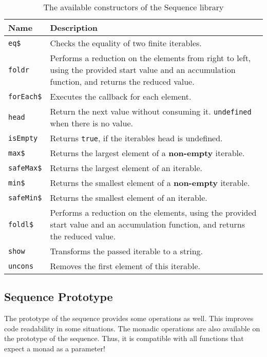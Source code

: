 \begin{table}[H]
  \centering
  \begin{tabularx}{\textwidth}{| l | X |} \hline
    \textbf{Name} & \textbf{Description} \\ \hline
    \texttt{eq\$} & Checks the equality of two finite iterables. \\ \hline 
    \texttt{foldr} & Performs a reduction on the elements from right to left, using the provided start value and an accumulation function, and returns the reduced value. \\ \hline 
    \texttt{forEach\$} & Executes the callback for each element. \\ \hline 
    \texttt{head} & Return the next value without consuming it. \texttt{undefined} when there is no value. \\ \hline 
    \texttt{isEmpty} & Returns \texttt{true}, if the iterables head is undefined. \\ \hline 
    \texttt{max\$} & Returns the largest element of a \textbf{non-empty} iterable. \\ \hline 
    \texttt{safeMax\$} & Returns the largest element of an iterable. \\ \hline 
    \texttt{min\$} & Returns the smallest element of a \textbf{non-empty} iterable. \\ \hline 
    \texttt{safeMin\$} & Returns the smallest element of an iterable. \\ \hline 
    \texttt{foldl\$} & Performs a reduction on the elements, using the provided start value and an accumulation function, and returns the reduced value. \\ \hline 
    \texttt{show} & Transforms the passed iterable to a string. \\ \hline 
    \texttt{uncons} & Removes the first element of this iterable. \\ \hline 
  \end{tabularx}
  \caption{The available constructors of the Sequence library}
  \label{tab:api_term_ops}
\end{table}

\subsection{Sequence Prototype} %
\label{sub:Sequence Prototype}
The prototype of the sequence provides some operations as well. This improves
code readability in some situations. The monadic operations are also available
on the prototype of the sequence. Thus, it is compatible with all functions
that expect a monad as a parameter!

